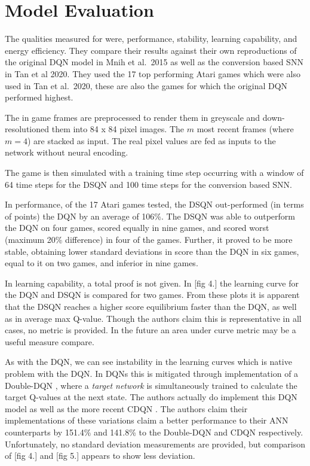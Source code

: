 \documentclass[
]{article}
\begin{document}
\hypertarget{model-evaluation}{%
\section{Model Evaluation}\label{model-evaluation}}

The qualities measured for were, performance, stability, learning
capability, and energy efficiency. They compare their results against
their own reproductions of the original DQN model in Mnih et al.~2015 as
well as the conversion based SNN in Tan et al 2020. They used the 17 top
performing Atari games which were also used in Tan et al.~2020, these
are also the games for which the original DQN performed highest.

The in game frames are preprocessed to render them in greyscale and
down-resolutioned them into 84 x 84 pixel images. The \(m\) most recent
frames (where \(m=4\)) are stacked as input. The real pixel values are
fed as inputs to the network without neural encoding.

The game is then simulated with a training time step occurring with a
window of 64 time steps for the DSQN and 100 time steps for the
conversion based SNN.

In performance, of the 17 Atari games tested, the DSQN out-performed (in
terms of points) the DQN by an average of 106\%. The DSQN was able to
outperform the DQN on four games, scored equally in nine games, and
scored worst (maximum 20\% difference) in four of the games. Further, it
proved to be more stable, obtaining lower standard deviations in score
than the DQN in six games, equal to it on two games, and inferior in
nine games.

In learning capability, a total proof is not given. In {[}fig 4.{]} the
learning curve for the DQN and DSQN is compared for two games. From
these plots it is apparent that the DSQN reaches a higher score
equilibrium faster than the DQN, as well as in average max Q-value.
Though the authors claim this is representative in all cases, no metric
is provided. In the future an area under curve metric may be a useful
measure compare.

As with the DQN, we can see instability in the learning curves which is
native problem with the DQN. In DQNs this is mitigated through
implementation of a Double-DQN
\autocite{wengTianshouHighlyModularized2022} , where a
\emph{target network} is simultaneously trained to calculate the target
Q-values at the next state. The authors actually do implement this DQN
model as well as the more recent CDQN
\autocite{wangConvergentEfficientDeep2022}. The authors claim
their implementations of these variations claim a better performance to
their ANN counterparts by 151.4\% and 141.8\% to the Double-DQN and CDQN
respectively. Unfortunately, no standard deviation measurements are
provided, but comparison of {[}fig 4.{]} and {[}fig 5.{]} appears to
show less deviation.
\end{document}
